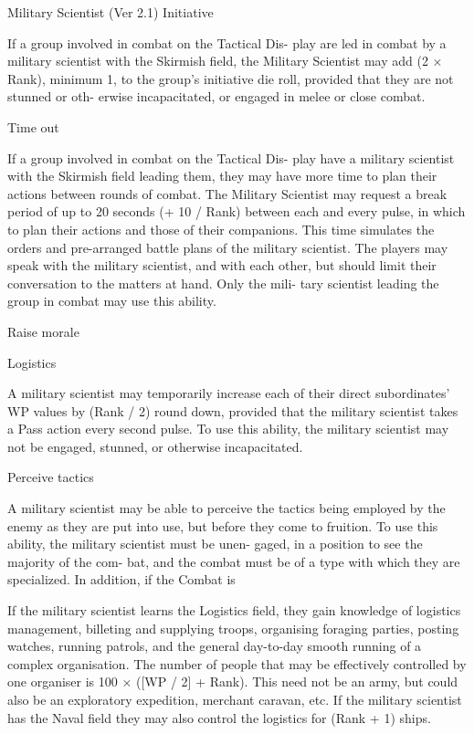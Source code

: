 \begin{Chapter}{Military Scientist (Ver 2.1)}
Initiative 

If a group involved in combat on the Tactical Dis-
play  are  led  in  combat  by  a  military  scientist  with 
the  Skirmish  field,  the  Military  Scientist  may  add 
(2  ×  Rank),  minimum  1,  to  the  group’s  initiative 
die roll, provided that they are not stunned or oth-
erwise incapacitated, or engaged in melee  or close 
combat. 

Time out 

If a group involved in combat on the Tactical Dis-
play  have  a  military  scientist  with  the  Skirmish 
field  leading  them,  they  may  have  more  time  to 
plan  their  actions  between  rounds  of  combat.  The 
Military Scientist may request a break period of up 
to  20  seconds  (+  10  /  Rank)  between  each  and 
every  pulse,  in  which  to  plan  their  actions  and 
those of their companions. This time simulates the 
orders and pre-arranged battle plans of the military 
scientist.  The  players  may  speak  with  the  military 
scientist, and with each other, but should limit their 
conversation to the matters at hand. Only the mili-
tary scientist leading the group in combat may use 
this ability. 

Raise morale 

Logistics 

A military scientist may temporarily  increase each 
of their direct subordinates’ WP values by (Rank / 
2) round down, provided that the military scientist 
takes a Pass action every second pulse. To use this 
ability,  the  military  scientist  may  not  be  engaged, 
stunned, or otherwise incapacitated. 

Perceive tactics 

A  military  scientist  may  be  able  to  perceive  the 
tactics  being  employed  by  the  enemy  as  they  are 
put  into  use,  but  before  they  come  to  fruition.  To 
use this ability, the military scientist must be unen-
gaged, in a position to see the majority of the com-
bat,  and the  combat  must be  of  a  type  with  which 
they  are  specialized.  In  addition,  if  the  Combat  is 

If  the  military  scientist  learns  the  Logistics  field, 
they  gain  knowledge  of  logistics  management, 
billeting and supplying troops, organising foraging 
parties,  posting  watches,  running  patrols,  and  the 
general  day-to-day  smooth  running  of  a  complex 
organisation.  The  number  of  people  that  may  be 
effectively  controlled  by  one  organiser  is  100  × 
([WP  / 2]  +  Rank).  This need not be  an  army,  but 
could  also  be  an  exploratory  expedition,  merchant 
caravan, etc. If the military scientist has the Naval 
field  they  may  also  control  the  logistics  for  (Rank 
+ 1) ships.

\end{Chapter}
